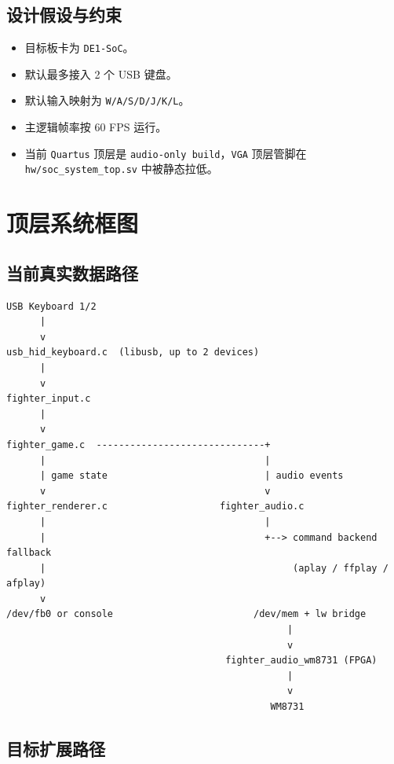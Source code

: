 \documentclass[12pt,a4paper]{ctexart}
\begin{document}
\subsection{设计假设与约束}

\begin{itemize}
  \item 目标板卡为 \texttt{DE1-SoC}。
  \item 默认最多接入 2 个 USB 键盘。
  \item 默认输入映射为 \texttt{W/A/S/D/J/K/L}。
  \item 主逻辑帧率按 60 FPS 运行。
  \item 当前 \texttt{Quartus} 顶层是 \texttt{audio-only build}，\texttt{VGA} 顶层管脚在 \texttt{hw/soc\_system\_top.sv} 中被静态拉低。
\end{itemize}

\section{顶层系统框图}

\subsection{当前真实数据路径}

\begin{lstlisting}[style=fighterstyle]
USB Keyboard 1/2
      |
      v
usb_hid_keyboard.c  (libusb, up to 2 devices)
      |
      v
fighter_input.c
      |
      v
fighter_game.c  ------------------------------+
      |                                       |
      | game state                            | audio events
      v                                       v
fighter_renderer.c                    fighter_audio.c
      |                                       |
      |                                       +--> command backend fallback
      |                                            (aplay / ffplay / afplay)
      v
/dev/fb0 or console                         /dev/mem + lw bridge
                                                  |
                                                  v
                                       fighter_audio_wm8731 (FPGA)
                                                  |
                                                  v
                                               WM8731
\end{lstlisting}

\subsection{目标扩展路径}
\end{document}
